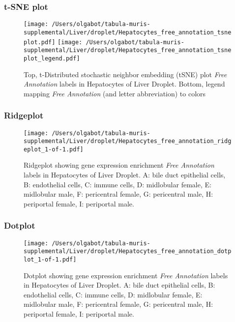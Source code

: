 \clearpage
\subsubsection{t-SNE plot}
\begin{figure}[h]
\centering
\texttt{[image: /Users/olgabot/tabula-muris-supplemental/Liver/droplet/Hepatocytes\_free\_annotation\_tsneplot.pdf]}
\texttt{[image: /Users/olgabot/tabula-muris-supplemental/Liver/droplet/Hepatocytes\_free\_annotation\_tsneplot\_legend.pdf]}
\caption{Top, t-Distributed stochastic neighbor embedding (tSNE) plot  \emph{Free Annotation} labels in Hepatocytes of Liver Droplet. Bottom, legend mapping \emph{Free Annotation} (and letter abbreviation) to colors}
\end{figure}


\clearpage

\subsubsection{Ridgeplot}
\begin{figure}[h]
\centering
\texttt{[image: /Users/olgabot/tabula-muris-supplemental/Liver/droplet/Hepatocytes\_free\_annotation\_ridgeplot\_1-of-1.pdf]}

\caption{ Ridgeplot  showing gene expression enrichment \emph{Free Annotation} labels in Hepatocytes of Liver Droplet. A: bile duct epithelial cells, B: endothelial cells, C: immune cells, D: midlobular female, E: midlobular male, F: pericentral female, G: pericentral male, H: periportal female, I: periportal male.}
\end{figure}


\clearpage

\subsubsection{Dotplot}
\begin{figure}[h]
\centering
\texttt{[image: /Users/olgabot/tabula-muris-supplemental/Liver/droplet/Hepatocytes\_free\_annotation\_dotplot\_1-of-1.pdf]}

\caption{ Dotplot  showing gene expression enrichment \emph{Free Annotation} labels in Hepatocytes of Liver Droplet. A: bile duct epithelial cells, B: endothelial cells, C: immune cells, D: midlobular female, E: midlobular male, F: pericentral female, G: pericentral male, H: periportal female, I: periportal male.}
\end{figure}



